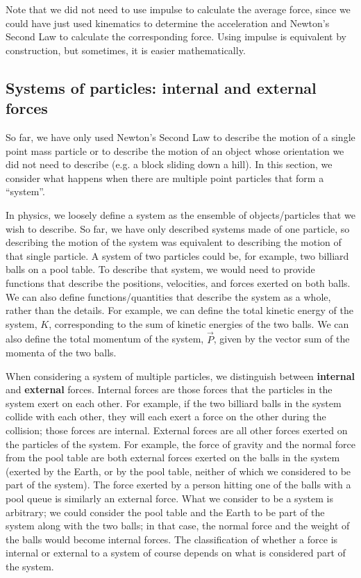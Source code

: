 \begin{example}
Note that we did not need to use impulse to calculate the average force, since we could have just used kinematics to determine the acceleration and Newton's Second Law to calculate the corresponding force. Using impulse is equivalent by construction, but sometimes, it is easier mathematically.
\end{example}


\subsection{Systems of particles: internal and external forces}
So far, we have only used Newton's Second Law to describe the motion of a single point mass particle or to describe the motion of an object whose orientation we did not need to describe (e.g. a block sliding down a hill). In this section, we consider what happens when there are multiple point particles that form a ``system''.

In physics, we loosely define a system as the ensemble of objects/particles that we wish to describe. So far, we have only described systems made of one particle, so describing the motion of the system was equivalent to describing the motion of that single particle. A  system of two particles could be, for example, two billiard balls on a pool table. To describe that system, we would need to provide functions that describe the positions, velocities, and forces exerted on both balls. We can also define functions/quantities that describe the system as a whole, rather than the details. For example, we can define the total kinetic energy of the system, $K$, corresponding to the sum of kinetic energies of the two balls. We can also define the total momentum of the system, $\vec P$, given by the vector sum of the momenta of the two balls.

When considering a system of multiple particles, we distinguish between \textbf{internal} and \textbf{external} forces. Internal forces are those forces that the particles in the system exert on each other. For example, if the two billiard balls in the system collide with each other, they will each exert a force on the other during the collision; those forces are internal. External forces are all other forces exerted on the particles of the system. For example, the force of gravity and the normal force from the pool table are both external forces exerted on the balls in the system (exerted by the Earth, or by the pool table, neither of which we considered to be part of the system). The force exerted by a person hitting one of the balls with a pool queue is similarly an external force. What we consider to be a system is arbitrary; we could consider the pool table and the Earth to be part of the system along with the two balls; in that case, the normal force and the weight of the balls would become internal forces. The classification of whether a force is internal or external to a system of course depends on what is considered part of the system.

